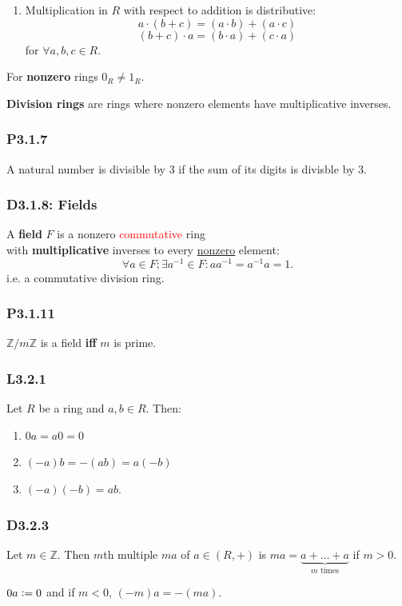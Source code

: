 \documentclass{article}
\newcommand{\deq}{\vcentcolon=}
\begin{document}
\begin{multicols*}{3}
\begin{enumerate}
    \item Multiplication in $R$ with respect to addition
    is distributive:
    $$a\cdot(b+c)=(a\cdot b)+(a\cdot c)$$
    $$(b+c)\cdot a=(b\cdot a)+(c\cdot a)$$
    for $\forall a,b,c\in R$.
\end{enumerate}
For \textbf{nonzero} rings $0_R\neq1_R$.

\textbf{Division rings} are rings where nonzero elements
have multiplicative inverses.

\subsubsection*{P3.1.7}
A natural number is divisible by $3$ if
the sum of its digits is divisble by $3$.

\subsubsection*{D3.1.8: Fields}
A \textbf{field} $F$ is a nonzero \textcolor{red}{commutative} ring \\
with \textbf{multiplicative} inverses to every
\underline{nonzero} element:
$$\forall a\in F;\exists a^{-1}\in F:
aa^{-1}=a^{-1}a=1.$$
i.e. a commutative division ring.

\subsubsection*{P3.1.11}
$\mathbb{Z}/m\mathbb{Z}$
is a field \textbf{if{}f} $m$ is prime.

\subsubsection*{L3.2.1}
Let $R$ be a ring and $a,b\in R$. Then:
\begin{enumerate}
    \item $0a=a0=0$
    \item $(-a)b=-(ab)=a(-b)$
    \item $(-a)(-b)=ab$.
\end{enumerate}

\subsubsection*{D3.2.3}
Let $m\in\mathbb{Z}$. Then $m$th multiple $ma$ of
$a\in(R,+)$ is $ma=\underbrace{a+\dots+a}_
\text{$m$ times}$ if $m>0$.

$0a\deq0$ and if $m<0$, $(-m)a=-(ma)$.


\end{multicols*}
\end{document}
